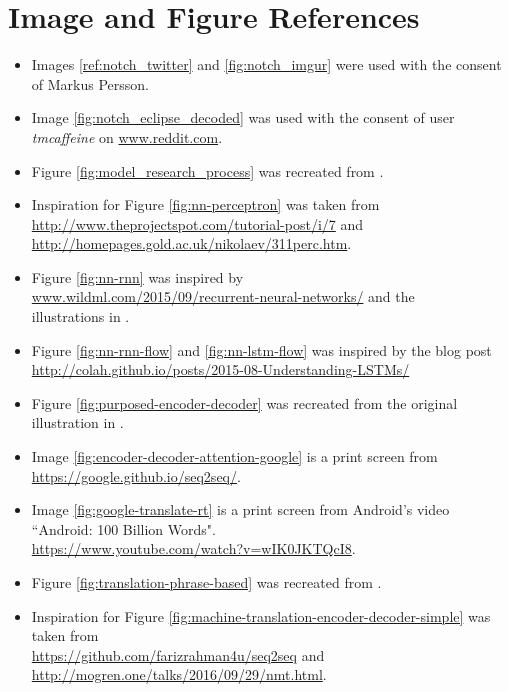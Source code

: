 
\chapter{Image and Figure References}


\begin{itemize}
    \item Images \ref{ref:notch_twitter} and \ref{fig:notch_imgur} were used with the consent of Markus Persson.
    \item Image \ref{fig:notch_eclipse_decoded} was used with the consent of user \emph{tmcaffeine} on \url{www.reddit.com}.
    \item Figure \ref{fig:model_research_process} was recreated from \citep{oates2005researching}.
    \item Inspiration for Figure \ref{fig:nn-perceptron} was taken from\\\url{http://www.theprojectspot.com/tutorial-post/i/7} and \\ \url{http://homepages.gold.ac.uk/nikolaev/311perc.htm}.
    \item Figure \ref{fig:nn-rnn} was inspired by \\ \url{www.wildml.com/2015/09/recurrent-neural-networks/} and the\\ illustrations in \citep{goodfellow2016deeplearning}.
    \item Figure \ref{fig:nn-rnn-flow} and \ref{fig:nn-lstm-flow} was inspired by the blog post \\ \url{http://colah.github.io/posts/2015-08-Understanding-LSTMs/}
    \item Figure \ref{fig:purposed-encoder-decoder} was recreated from the original illustration in  \citep{cho2014learning}.
    \item Image \ref{fig:encoder-decoder-attention-google} is a print screen from \url{https://google.github.io/seq2seq/}.
    \item Image \ref{fig:google-translate-rt} is a print screen from Android's video ``Android: 100 Billion Words".\\ \url{https://www.youtube.com/watch?v=wIK0JKTQcI8}.
    \item Figure \ref{fig:translation-phrase-based} was recreated from \citep{koehn2010statistical}.
    \item Inspiration for Figure \ref{fig:machine-translation-encoder-decoder-simple} was taken from \\ \url{https://github.com/farizrahman4u/seq2seq} and\\\url{http://mogren.one/talks/2016/09/29/nmt.html}.
\end{itemize}